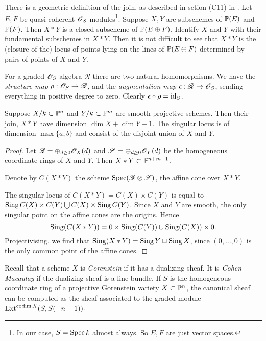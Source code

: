 There is a geometric definition of the join, as described in setion (C11) in \cite{altman_joins}. Let $E,F$ be quasi-coherent $\OO_S$-modules\footnote{In our case, $S=\Spec k$ almost always. So $E,F$ are just vector spaces.}. Suppose $X,Y$ are subschemes of $\P(E)$ and $\P(F)$. Then $X\ast Y$ is a closed subscheme of $\P(E \oplus F)$. Identify $X$ and $Y$ with their fundamental subschemes in $X \ast Y$. Then it is not difficult to see that $X \ast Y$ is the (closure of the) locus of points lying on the lines of $\P(E \oplus F)$ determined by pairs of points of $X$ and $Y$. 

For a graded $\OO_S$-algebra $\mathscr R$ there are two natural homomorphisms. We have the \emph{structure map} $\rho: \OO_S \to \mathscr R$, and the \emph{augmentation map} $\epsilon: \mathscr R \to \OO_S$, sending everything in positive degree to zero. Clearly $\epsilon \circ \rho = \id_S$.



\begin{proposition}
\label{lemma:join}
Suppose $X/k \subset \P^n$ and $Y/k \subset \P^m$ are smooth projective schemes. Then their join, $X \ast Y$ have dimension $\dim X+\dim Y+1$. The singular locus is of dimension $\max\{a,b\}$ and consist of the disjoint union of $X$ and $Y$.
\end{proposition}
\begin{proof}
Let $\mathscr R = \oplus_{d \geq 0} \OO_X(d)$ and $\mathscr S = \oplus_{d \geq 0} \OO_Y(d)$ be the homogeneous coordinate rings of $X$ and $Y$. Then $X \ast Y \subset \P^{n+m+1}$. 

Denote by $C(X \ast Y)$ the scheme $\Spec (\mathscr R \otimes \mathscr S)$, the affine cone over $X \ast Y$. 

The singular locus of $C(X \ast Y) = C(X) \times C(Y)$ is equal to $\Sing C(X) \times C(Y) \bigcup C(X) \times \Sing C(Y)$. Since $X$ and $Y$ are smooth, the only singular point on the affine cones are the origins. Hence
$$
\Sing(C(X \ast Y)) = 0 \times \Sing(C(Y)) \cup \Sing(C(X)) \times 0.
$$
Projectivising, we find that $\Sing(X \ast Y) = \Sing Y \sqcup \Sing X$, since $(0,\ldots,0)$ is the only common point of the affine cones. 
\end{proof}

Recall that a scheme $X$ is \emph{Gorenstein} if it has a dualizing sheaf. It is \emph{Cohen--Macaulay} if the dualizing sheaf is a line bundle. If $S$ is the homogeneous coordinate ring of a projective Gorenstein variety $X \subset \P^n$, the canonical sheaf can be computed as the sheaf associated to the graded module $\Ext^{\codim X}(S,S(-n-1))$.

